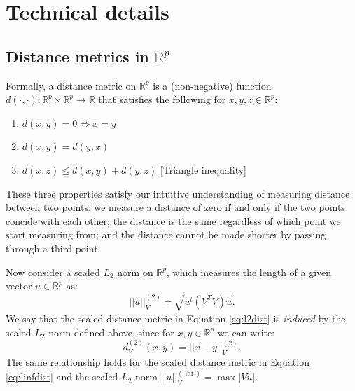 \documentclass{article}
\newcommand{\R}{\mathbb{R}}
\newcommand{\Rp}{\mathbb{R}^p}
\begin{document}


\section{Technical details}

\subsection{Distance metrics in $\Rp$}
\label{app:distmetrics}

Formally, a distance metric on $\Rp$ is a (non-negative) function $d(\cdot, \cdot): \Rp \times \Rp \to \R$ that satisfies the following for $x,y,z \in \Rp$:
\begin{enumerate}
    \item $d(x,y) = 0 \iff x = y$
    \item $d(x,y) = d(y,x)$
    \item $d(x,z) \leq d(x,y) + d(y,z)$ [Triangle inequality]
\end{enumerate}
These three properties satisfy our intuitive understanding of measuring distance between two points: we measure a distance of zero if and only if the two points concide with each other; the distance is the same regardless of which point we start measuring from; and the distance cannot be made shorter by passing through a third point.

Now consider a scaled $L_2$ norm on $\Rp$, which measures the length of a given vector $u \in \Rp$ as:
$$||u||_V^{(2)} = \sqrt{u^t (V^T V) u}.$$
We say that the scaled distance metric in Equation \ref{eq:l2dist} is \textit{induced} by the scaled $L_2$ norm defined above, since for $x,y \in \Rp$ we can write:
$$d_V^{(2)}(x,y) = ||x - y||_V^{(2)}.$$
The same relationship holds for the scaled distance metric in Equation \ref{eq:linfdist} and the scaled $L_2$ norm $||u||_V^{(\inf)} = \max|Vu|.$
\end{document}
